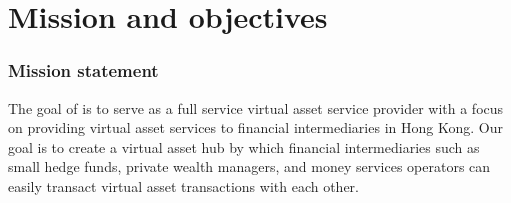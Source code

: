 \chapter{Mission and objectives}

\subsection{Mission statement}

The goal of \firmfullname is to serve as a full service virtual asset
service provider with a focus on providing virtual asset services to
financial intermediaries in Hong Kong.  Our goal is to create a
virtual asset hub by which financial intermediaries such as small
hedge funds, private wealth managers, and money services operators can
easily transact virtual asset transactions with each other.

